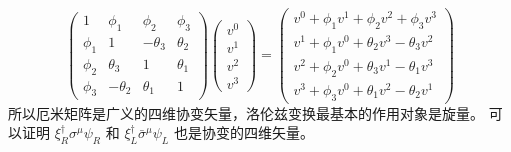 \begin{equation}
\left(\begin{array}{cccc}1 & \phi_{1} & \phi_{2} & \phi_{3} \\ \phi_{1} & 1 & -\theta_{3} & \theta_{2} \\ \phi_{2} & \theta_{3} & 1 & \theta_{1} \\ \phi_{3} & -\theta_{2} & \theta_{1} & 1\end{array}\right)\left(\begin{array}{c}v^{0} \\ v^{1} \\ v^{2} \\ v^{3}\end{array}\right)=\left(\begin{array}{c}v^{0}+\phi_{1} v^{1}+\phi_{2} v^{2}+\phi_{3} v^{3} \\ v^{1}+\phi_{1} v^{0}+\theta_{2} v^{3}-\theta_{3} v^{2} \\ v^{2}+\phi_{2} v^{0}+\theta_{3} v^{1}-\theta_{1} v^{3} \\ v^{3}+\phi_{3} v^{0}+\theta_{1} v^{2}-\theta_{2} v^{1}\end{array}\right)
\end{equation}
所以厄米矩阵是广义的四维协变矢量，洛伦兹变换最基本的作用对象是旋量。
可以证明 $\xi_{R}^{\dagger} \sigma^{\mu} \psi_{R}$ 和 $\xi_{L}^{\dagger} \bar{\sigma}^{\mu} \psi_{L}$ 也是协变的四维矢量。
